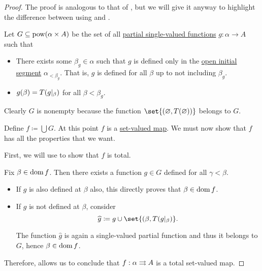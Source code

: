 \begin{proof}
  The proof is analogous to that of , but we will give it anyway to highlight the difference between using  and .

  Let \( G \subseteq \operatorname{pow}(\alpha \times A) \) be the set of all \hyperref[def:set_valued_map/partial]{partial single-valued functions} \( g: \alpha \to A \) such that
  \begin{itemize}
    \item There exists some \( \beta_g \in \alpha \) such that \( g \) is defined only in the \hyperref[def:order_interval/unbounded]{open initial segment} \( \alpha_{< \beta_g} \). That is, \( g \) is defined for all \( \beta \) up to not including \( \beta_g \).

    \item \( g(\beta) = T(g\vert_\beta) \) for all \( \beta < \beta_g \).
  \end{itemize}

  Clearly \( G \) is nonempty because the function \( \set{ (\varnothing, T(\varnothing)) } \) belongs to \( G \).

  Define \( f \coloneqq \bigcup G \). At this point \( f \) is a \hyperref[def:function]{set-valued map}. We must now show that \( f \) has all the properties that we want.

   First, we will use  to show that \( f \) is total.

  Fix \( \beta \in \operatorname{dom} f \). Then there exists a function \( g \in G \) defined for all \( \gamma < \beta \).

  \begin{itemize}
    \item If \( g \) is also defined at \( \beta \) also, this directly proves that \( \beta \in \operatorname{dom} f \).
    \item If \( g \) is not defined at \( \beta \), consider
    \begin{equation*}
      \widehat g \coloneqq g \cup \set{ (\beta, T(g\restr_\beta) }.
    \end{equation*}

    The function \( \widehat g \) is again a single-valued partial function and thus it belongs to \( G \), hence \( \beta \in \operatorname{dom} f \).
  \end{itemize}

  Therefore,  allows us to conclude that \( f: \alpha \rightrightarrows A \) is a total set-valued map.


\end{proof}
